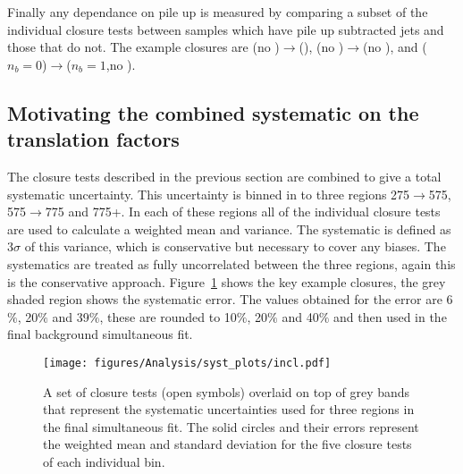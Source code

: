 Finally any dependance on pile up is measured by comparing a subset of the 
individual closure tests between samples which have pile up subtracted jets and 
those that do not. The example closures are \mj(no \alt)$\rightarrow$\mj(\altg),
\mj(no \alt)$\rightarrow$\mmj(no \alt), and \mj($n_b = 0$)$\rightarrow$\mj($n_b 
= 1$,no \alt).

\subsection{Motivating the combined systematic on the translation factors}
\label{sub:motivating_the_combined_systematic_on_the_translation_factors}
The closure tests described in the previous section are combined to give a total systematic uncertainty. This uncertainty is binned in to three \HT regions \unit{275}{\GeV}$\rightarrow$\unit{575}{\GeV}, \unit{575}{\GeV}$\rightarrow$\unit{775}{\GeV} and \unit{775}{\GeV}+. In each of these regions all of the individual closure tests are used to calculate a weighted mean and variance. The systematic is defined as $3\sigma$ of this variance, which is conservative but necessary to cover any biases. The systematics are treated as fully uncorrelated between the three regions, again this is the conservative approach. Figure~\ref{fig:closure-summary} shows the key example closures, the grey shaded region shows the systematic error. The values obtained for the error are 6$\%$, 20$\%$ and 39$\%$, these are rounded to 10$\%$, 20$\%$ and 40$\%$ and then used in the final background simultaneous fit.

\begin{figure}[!h]
  \begin{center}
    \texttt{[image: figures/Analysis/syst\_plots/incl.pdf]}
    \caption{A set of closure tests (open symbols) overlaid on top of
      grey bands that represent the systematic uncertainties used for
      three \HT regions in the final simultaneous fit. The solid
      circles and their errors represent the weighted mean and
      standard deviation for the five closure tests of each individual
      \HT bin.}
    \label{fig:closure-summary}
  \end{center}
\end{figure}




